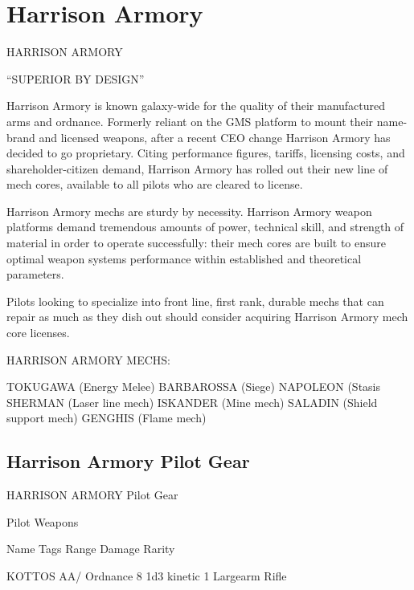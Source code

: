 \section{Harrison Armory}


                          HARRISON ARMORY  

                                     “SUPERIOR BY DESIGN”  

Harrison Armory is known galaxy-wide for the quality of their manufactured arms and  
ordnance. Formerly reliant on the GMS platform to mount their name-brand and licensed  
weapons, after a recent CEO change Harrison Armory has decided to go proprietary. Citing  
performance figures, tariffs, licensing costs, and shareholder-citizen demand, Harrison Armory  
has rolled out their new line of mech cores, available to all pilots who are cleared to license. 
 

Harrison Armory mechs are sturdy by necessity. Harrison Armory weapon platforms demand  
tremendous amounts of power, technical skill, and strength of material in order to operate  
successfully: their mech cores are built to ensure optimal weapon systems performance within  
established and theoretical parameters. 
 

Pilots looking to specialize into front line, first rank, durable mechs that can repair as much as  
they dish out should consider acquiring Harrison Armory mech core licenses.     

HARRISON ARMORY MECHS:  

TOKUGAWA (Energy Melee)  
BARBAROSSA (Siege)  
NAPOLEON (Stasis  
SHERMAN (Laser line mech)  
ISKANDER (Mine mech)  
SALADIN (Shield support mech)  
GENGHIS (Flame mech)  

                                                                                                    
\subsection{Harrison Armory Pilot Gear}

                                  HARRISON ARMORY Pilot Gear  

                                                    Pilot Weapons  

  Name                    Tags                                      Range            Damage                  Rarity 

 KOTTOS AA/               Ordnance                                  8                1d3 kinetic             1 
 Largearm Rifle 

